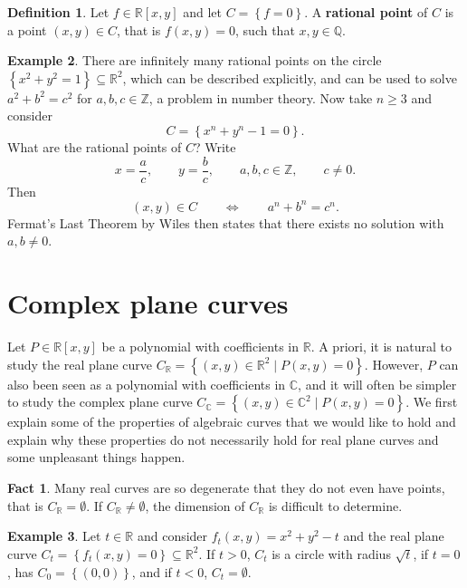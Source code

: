 \documentclass{article}
\newcommand{\Z}{\mathbb{Z}}
\newcommand{\Q}{\mathbb{Q}}
\newcommand{\R}{\mathbb{R}}
\newcommand{\C}{\mathbb{C}}
\newcommand{\rb}[1]{\left( #1 \right)}
\renewcommand{\sb}[1]{\left[ #1 \right]}
\newcommand{\cb}[1]{\left\{ #1 \right\}}
\theoremstyle{definition}\newtheorem{definition}{Definition}[section]
\theoremstyle{definition}\newtheorem{notation}[definition]{Notation}
\theoremstyle{definition}\newtheorem{remark}[definition]{Remark}
\theoremstyle{definition}\newtheorem{example}[definition]{Example}
\theoremstyle{definition}\newtheorem{fact}{Fact}
\theoremstyle{definition}\newtheorem{exercise}{Exercise}
\begin{document}

\begin{definition}
Let $ f \in \R\sb{x, y} $ and let $ C = \cb{f = 0} $. A \textbf{rational point} of $ C $ is a point $ \rb{x, y} \in C $, that is $ f\rb{x, y} = 0 $, such that $ x, y \in \Q $.
\end{definition}

\begin{example}
There are infinitely many rational points on the circle $ \cb{x^2 + y^2 = 1} \subseteq \R^2 $, which can be described explicitly, and can be used to solve $ a^2 + b^2 = c^2 $ for $ a, b, c \in \Z $, a problem in number theory. Now take $ n \ge 3 $ and consider
$$ C = \cb{x^n + y^n - 1 = 0}. $$
What are the rational points of $ C $? Write
$$ x = \dfrac{a}{c}, \qquad y = \dfrac{b}{c}, \qquad a, b, c \in \Z, \qquad c \ne 0. $$
Then
$$ \rb{x, y} \in C \qquad \iff \qquad a^n + b^n = c^n. $$
Fermat's Last Theorem by Wiles then states that there exists no solution with $ a, b \ne 0 $.
\end{example}

\section{Complex plane curves}

Let $ P \in \R\sb{x, y} $ be a polynomial with coefficients in $ \R $. A priori, it is natural to study the real plane curve $ C_\R = \cb{\rb{x, y} \in \R^2 \mid P\rb{x, y} = 0} $. However, $ P $ can also been seen as a polynomial with coefficients in $ \C $, and it will often be simpler to study the complex plane curve $ C_\C = \cb{\rb{x, y} \in \C^2 \mid P\rb{x, y} = 0} $. We first explain some of the properties of algebraic curves that we would like to hold and explain why these properties do not necessarily hold for real plane curves and some unpleasant things happen.

\begin{fact}
Many real curves are so degenerate that they do not even have points, that is $ C_\R = \emptyset $. If $ C_\R \ne \emptyset $, the dimension of $ C_\R $ is difficult to determine.
\end{fact}

\begin{example}
\label{eg:2.1}
Let $ t \in \R $ and consider $ f_t\rb{x, y} = x^2 + y^2 - t $ and the real plane curve $ C_t = \cb{f_t\rb{x, y} = 0} \subseteq \R^2 $. If $ t > 0 $, $ C_t $ is a circle with radius $ \sqrt{t} $, if $ t = 0 $, has $ C_0 = \cb{\rb{0, 0}} $, and if $ t < 0 $, $ C_t = \emptyset $.
\end{example}
\end{document}
